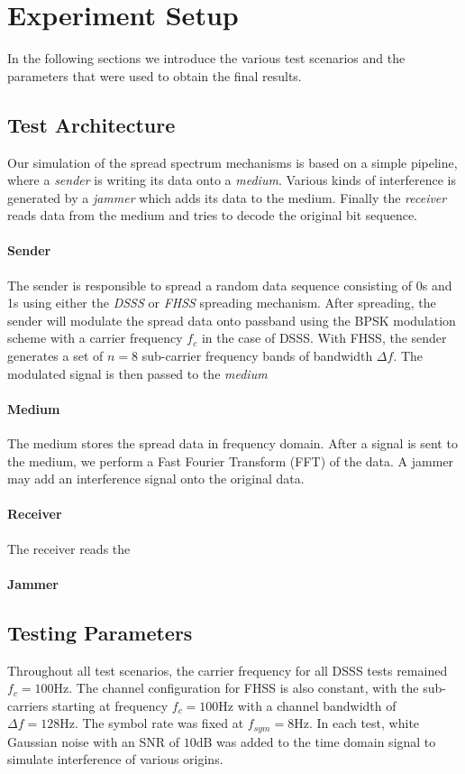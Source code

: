 \section{Experiment Setup}

	In the following sections we introduce the various test scenarios and the parameters that were used to obtain the final results.
	
	\subsection{Test Architecture}
	Our simulation of the spread spectrum mechanisms is based on a simple pipeline, where a \emph{sender} is writing its data onto a \emph{medium}. Various kinds of interference is generated by a \emph{jammer} which adds its data to the medium. Finally the \emph{receiver} reads data from the medium and tries to decode the original bit sequence.
	
	\paragraph{Sender}
	The sender is responsible to spread a random data sequence consisting of 0s and 1s using either the \emph{DSSS} or \emph{FHSS} spreading mechanism. After spreading, the sender will modulate the spread data onto passband using the BPSK modulation scheme with a carrier frequency $f_c$ in the case of DSSS. With FHSS, the sender generates a set of $n=8$ sub-carrier frequency bands of bandwidth $\Delta f$. The modulated signal is then passed to the \emph{medium}
	
	\paragraph{Medium} 
	The medium stores the spread data in frequency domain. After a signal is sent to the medium, we perform a Fast Fourier Transform (FFT) of the data. A jammer may add an interference signal onto the original data.
	
	\paragraph{Receiver}
	The receiver reads the 
	
	\paragraph{Jammer}
	
	
	\subsection{Testing Parameters}
	Throughout all test scenarios, the carrier frequency for all DSSS tests remained $f_c = 100\text{Hz}$. The channel configuration for FHSS is also constant, with the sub-carriers starting at frequency $f_c = 100\text{Hz}$ with a channel bandwidth of $\Delta f = 128 \text{Hz}$. The symbol rate was fixed at $f_{sym} = 8\text{Hz}$. In each test, white Gaussian noise with an SNR of $10\text{dB}$ was added to the time domain signal to simulate interference of various origins.
	
